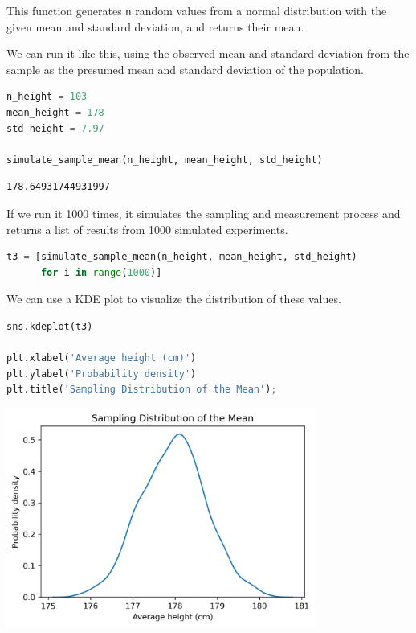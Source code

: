 This function generates \passthrough{\lstinline!n!} random values from a
normal distribution with the given mean and standard deviation, and
returns their mean.

We can run it like this, using the observed mean and standard deviation
from the sample as the presumed mean and standard deviation of the
population.

\begin{lstlisting}[language=Python,style=source]
n_height = 103
mean_height = 178
std_height = 7.97

simulate_sample_mean(n_height, mean_height, std_height)
\end{lstlisting}

\begin{lstlisting}[style=output]
178.64931744931997
\end{lstlisting}

If we run it 1000 times, it simulates the sampling and measurement
process and returns a list of results from 1000 simulated experiments.

\begin{lstlisting}[language=Python,style=source]
t3 = [simulate_sample_mean(n_height, mean_height, std_height)
      for i in range(1000)]
\end{lstlisting}

We can use a KDE plot to visualize the distribution of these values.

\begin{lstlisting}[language=Python,style=source]
sns.kdeplot(t3)

plt.xlabel('Average height (cm)')
plt.ylabel('Probability density')
plt.title('Sampling Distribution of the Mean');
\end{lstlisting}

\begin{center}
\includegraphics[width=4in]{chapters/11_resampling_files/11_resampling_60_0.png}
\end{center}

